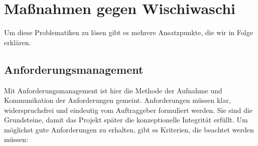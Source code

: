 \documentclass[a4paper, ngerman, 12pt, usenames, dvipsnames]{article}
\begin{document}
\section{Maßnahmen gegen Wischiwaschi}
Um diese Problematiken zu lösen gibt es mehrere Ansatzpunkte, die wir in Folge erklären.
\subsection{Anforderungsmanagement}
Mit Anforderungsmanagement ist hier die Methode der Aufnahme und Kommunikation der Anforderungen gemeint.
Anforderungen müssen klar, widerspruchsfrei und eindeutig vom Auftraggeber formuliert werden. Sie sind die Grundsteine, damit das Projekt später die konzeptionelle Integrität erfüllt. Um möglichst gute Anforderungen zu erhalten, gibt es Kriterien, die beachtet werden müssen:
\end{document}
